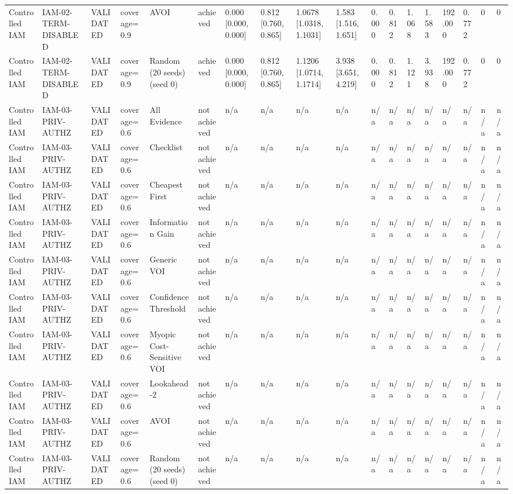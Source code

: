 \begin{table}[!ht]
{\begin{tabular}{llllllllllllllllll}
Controlled IAM & IAM-02-TERM-DISABLED & VALIDATED & coverage=0.9 & AVOI & achieved & 0.000 [0.000, 0.000] & 0.812 [0.760, 0.865] & 1.0678 [1.0318, 1.1031] & 1.583 [1.516, 1.651] & 0.000 & 0.812 & 1.068 & 1.583 & 192.000 & 0.772 & 0 & 0 \\
Controlled IAM & IAM-02-TERM-DISABLED & VALIDATED & coverage=0.9 & Random (20 seeds) (seed 0) & achieved & 0.000 [0.000, 0.000] & 0.812 [0.760, 0.865] & 1.1206 [1.0714, 1.1714] & 3.938 [3.651, 4.219] & 0.000 & 0.812 & 1.121 & 3.938 & 192.000 & 0.772 & 0 & 0 \\
Controlled IAM & IAM-03-PRIV-AUTHZ & VALIDATED & coverage=0.6 & All Evidence & not achieved & n/a & n/a & n/a & n/a & n/a & n/a & n/a & n/a & n/a & n/a & n/a & n/a \\
Controlled IAM & IAM-03-PRIV-AUTHZ & VALIDATED & coverage=0.6 & Checklist & not achieved & n/a & n/a & n/a & n/a & n/a & n/a & n/a & n/a & n/a & n/a & n/a & n/a \\
Controlled IAM & IAM-03-PRIV-AUTHZ & VALIDATED & coverage=0.6 & Cheapest First & not achieved & n/a & n/a & n/a & n/a & n/a & n/a & n/a & n/a & n/a & n/a & n/a & n/a \\
Controlled IAM & IAM-03-PRIV-AUTHZ & VALIDATED & coverage=0.6 & Information Gain & not achieved & n/a & n/a & n/a & n/a & n/a & n/a & n/a & n/a & n/a & n/a & n/a & n/a \\
Controlled IAM & IAM-03-PRIV-AUTHZ & VALIDATED & coverage=0.6 & Generic VOI & not achieved & n/a & n/a & n/a & n/a & n/a & n/a & n/a & n/a & n/a & n/a & n/a & n/a \\
Controlled IAM & IAM-03-PRIV-AUTHZ & VALIDATED & coverage=0.6 & Confidence Threshold & not achieved & n/a & n/a & n/a & n/a & n/a & n/a & n/a & n/a & n/a & n/a & n/a & n/a \\
Controlled IAM & IAM-03-PRIV-AUTHZ & VALIDATED & coverage=0.6 & Myopic Cost-Sensitive VOI & not achieved & n/a & n/a & n/a & n/a & n/a & n/a & n/a & n/a & n/a & n/a & n/a & n/a \\
Controlled IAM & IAM-03-PRIV-AUTHZ & VALIDATED & coverage=0.6 & Lookahead-2 & not achieved & n/a & n/a & n/a & n/a & n/a & n/a & n/a & n/a & n/a & n/a & n/a & n/a \\
Controlled IAM & IAM-03-PRIV-AUTHZ & VALIDATED & coverage=0.6 & AVOI & not achieved & n/a & n/a & n/a & n/a & n/a & n/a & n/a & n/a & n/a & n/a & n/a & n/a \\
Controlled IAM & IAM-03-PRIV-AUTHZ & VALIDATED & coverage=0.6 & Random (20 seeds) (seed 0) & not achieved & n/a & n/a & n/a & n/a & n/a & n/a & n/a & n/a & n/a & n/a & n/a & n/a \\

\end{tabular}}
\end{table}
